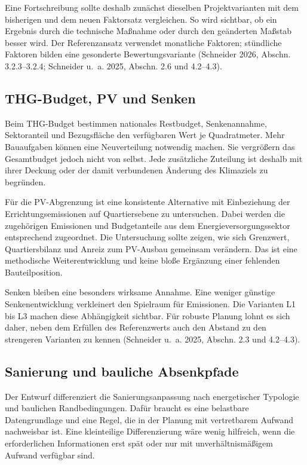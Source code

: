 \documentclass[
  ngerman,
  a4paper,
  DIV=11]{scrreprt}
\begin{document}
Eine Fortschreibung sollte deshalb zunächst dieselben Projektvarianten
mit dem bisherigen und dem neuen Faktorsatz vergleichen. So wird
sichtbar, ob ein Ergebnis durch die technische Maßnahme oder durch den
geänderten Maßstab besser wird. Der Referenzansatz verwendet monatliche
Faktoren; stündliche Faktoren bilden eine gesonderte Bewertungsvariante
(Schneider 2026, Abschn. 3.2.3--3.2.4; Schneider u.~a. 2025, Abschn. 2.6
und 4.2--4.3).

\subsection{THG-Budget, PV und Senken}\label{thg-budget-pv-und-senken}

Beim THG-Budget bestimmen nationales Restbudget, Senkenannahme,
Sektoranteil und Bezugsfläche den verfügbaren Wert je Quadratmeter. Mehr
Bauaufgaben können eine Neuverteilung notwendig machen. Sie vergrößern
das Gesamtbudget jedoch nicht von selbst. Jede zusätzliche Zuteilung ist
deshalb mit ihrer Deckung oder der damit verbundenen Änderung des
Klimaziels zu begründen.

Für die PV-Abgrenzung ist eine konsistente Alternative mit Einbeziehung
der Errichtungsemissionen auf Quartiersebene zu untersuchen. Dabei
werden die zugehörigen Emissionen und Budgetanteile aus dem
Energieversorgungssektor entsprechend zugeordnet. Die Untersuchung
sollte zeigen, wie sich Grenzwert, Quartiersbilanz und Anreiz zum
PV-Ausbau gemeinsam verändern. Das ist eine methodische
Weiterentwicklung und keine bloße Ergänzung einer fehlenden
Bauteilposition.

Senken bleiben eine besonders wirksame Annahme. Eine weniger günstige
Senkenentwicklung verkleinert den Spielraum für Emissionen. Die
Varianten L1 bis L3 machen diese Abhängigkeit sichtbar. Für robuste
Planung lohnt es sich daher, neben dem Erfüllen des Referenzwerts auch
den Abstand zu den strengeren Varianten zu kennen (Schneider u.~a. 2025,
Abschn. 2.3 und 4.2--4.3).

\subsection{Sanierung und bauliche
Absenkpfade}\label{sanierung-und-bauliche-absenkpfade}

Der Entwurf differenziert die Sanierungsanpassung nach energetischer
Typologie und baulichen Randbedingungen. Dafür braucht es eine
belastbare Datengrundlage und eine Regel, die in der Planung mit
vertretbarem Aufwand nachweisbar ist. Eine kleinteilige Differenzierung
wäre wenig hilfreich, wenn die erforderlichen Informationen erst spät
oder nur mit unverhältnismäßigem Aufwand verfügbar sind.
\end{document}
